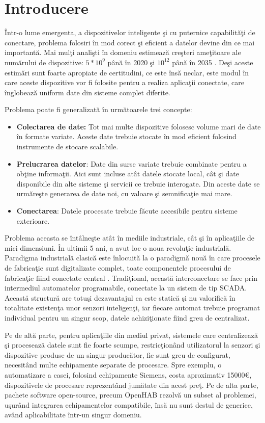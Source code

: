 \chapter{Introducere}

Într-o lume emergenta, a dispozitivelor inteligente şi cu puternice capabilităţi de conectare, problema folosiri în mod corect şi eficient a datelor devine din ce mai importantă. Mai mulţi analişti în domeniu estimează creşteri ameţitoare ale numărului de dispozitive: $5*10^9$ până în 2020 şi $10^{12}$ până în 2035 \autocite{iotGrowth}. Deşi aceste estimări sunt foarte apropiate de certitudini, ce este însă neclar, este modul în care aceste dispozitive vor fi folosite pentru a realiza aplicaţii conectate, care înglobează uniform date din sisteme complet diferite.

Problema poate fi generalizată în următoarele trei concepte:
\begin{itemize}
	\item  \textbf{Colectarea de date:} Tot mai multe dispozitive folosesc volume mari de date în formate variate. Aceste date trebuie stocate în mod eficient folosind instrumente de stocare scalabile. 
	\item \textbf{Prelucrarea datelor}: Date din surse variate trebuie combinate pentru a obţine informaţii. Aici sunt incluse atât datele stocate local, cât şi date disponibile din alte sisteme şi servicii ce trebuie interogate. Din aceste date se urmăreşte generarea de date noi, cu valoare şi semnificaţie mai mare.
	\item \textbf{Conectarea}: Datele procesate trebuie făcute accesibile pentru sisteme exterioare.
\end{itemize}

Problema aceasta se întâlneşte atât în mediile industriale, cât şi în aplicaţiile de mici dimensiuni. 
În ultimii 5 ani, a avut loc o noua revoluţie industrială. Paradigma industrială clasică este înlocuită la o paradigmă nouă în care procesele de fabricaţie sunt digitalizate complet, toate componentele procesului de fabricaţie fiind conectate central \autocite{deloitteReport}. 
Tradiţional, această interconectare se face prin intermediul automatelor programabile, conectate la un sistem de tip SCADA. Această structură are totuşi dezavantajul ca este statică şi nu valorifică în totalitate existenţa unor senzori inteligenţi, iar fiecare automat trebuie programat individual pentru un singur scop, datele achiziţionate fiind greu de centralizat.

Pe de altă parte, pentru aplicaţiile din mediul privat, sistemele care centralizează şi procesează datele sunt fie foarte scumpe, restricţionând utilizatorul la senzori şi dispozitive produse de un singur producător, fie sunt greu de configurat, necesitând multe echipamente separate de procesare. Spre exemplu, o automatizare a casei, folosind echipamente Siemens, costa aproximativ 15000\euro, dispozitivele de procesare reprezentând jumătate din acest preţ. Pe de alta parte, pachete software open-source, precum OpenHAB \autocite{openHab} rezolvă un subset al problemei, uşurând integrarea echipamentelor compatibile, însă nu sunt destul de generice, având aplicabilitate într-un singur domeniu.


